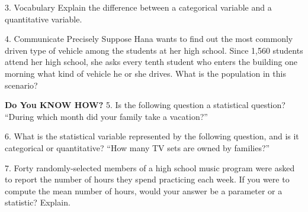 \documentclass{article}
\newenvironment{concept-summary}{}{}    %
\newcommand{\answer}[1]{}               %
\begin{document}
\begin{concept-summary}
\answer{The survey was conducted on a qualitative, or categorical, variable, rather than a quantitative variable.}
3. Vocabulary Explain the difference between a categorical variable and a quantitative variable.
\answer{A categorical variable (also referred to as a qualitative variable) is used to study data that can be classified into groups, whereas a quantitative variable is a numeric data value that can be counted, added, subtracted, and so on.}
4. Communicate Precisely Suppose Hana wants to find out the most commonly driven type of vehicle among the students at her high school. Since 1,560 students attend her high school, she asks every tenth student who enters the building one morning what kind of vehicle he or she drives. What is the population in this scenario?
\answer{The population is the 1,560 students that attend Hana's high school.}
\textbf{Do You KNOW HOW?}
5. Is the following question a statistical question?
``During which month did your family take a vacation?''
\answer{The question is not a statistical question because it can be answered using one piece of information.}
6. What is the statistical variable represented by the following question, and is it categorical or quantitative?
``How many TV sets are owned by families?''
\answer{The statistical variable is the number of TV sets owned by families. It is quantitative because it asks for an amount, rather than a brand or type of TV set.}
7. Forty randomly-selected members of a high school music program were asked to report the number of hours they spend practicing each week. If you were to compute the mean number of hours, would your answer be a parameter or a statistic? Explain.
\answer{Statistic; the data were collected from a sample, not the entire population.}
\end{concept-summary}
\end{document}

